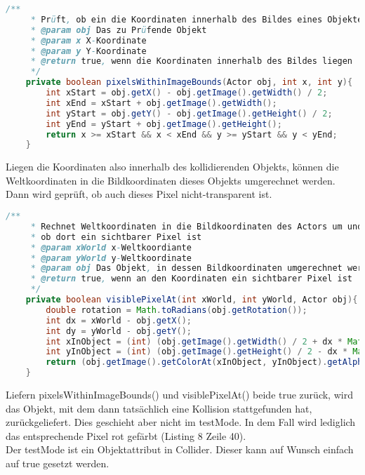 \documentclass{pi1}
\begin{document}
\begin{lstlisting}[caption={\emph{pixelsWithinImageBounds(Actor obj, int x, int y)}-Methode}, firstnumber=97, language=Java]
/**
     * Prüft, ob ein die Koordinaten innerhalb des Bildes eines Objektes liegen
     * @param obj Das zu Prüfende Objekt
     * @param x X-Koordinate
     * @param y Y-Koordinate
     * @return true, wenn die Koordinaten innerhalb des Bildes liegen
     */
    private boolean pixelsWithinImageBounds(Actor obj, int x, int y){
        int xStart = obj.getX() - obj.getImage().getWidth() / 2;
        int xEnd = xStart + obj.getImage().getWidth();
        int yStart = obj.getY() - obj.getImage().getHeight() / 2;
        int yEnd = yStart + obj.getImage().getHeight();
        return x >= xStart && x < xEnd && y >= yStart && y < yEnd;
    }
\end{lstlisting}

Liegen die Koordinaten also innerhalb des kollidierenden Objekts, können die Weltkoordinaten in die Bildkoordinaten dieses Objekts umgerechnet werden. Dann wird geprüft, ob auch dieses Pixel nicht-transparent ist.

\begin{lstlisting}[caption={\emph{visiblePixelAt(int xWorld, int yWorld, Actor obj)}-Methode}, firstnumber=80, language=Java]
/**
     * Rechnet Weltkoordinaten in die Bildkoordinaten des Actors um und prüft
     * ob dort ein sichtbarer Pixel ist
     * @param xWorld x-Weltkoordiante
     * @param yWorld y-Weltkoordinate
     * @param obj Das Objekt, in dessen Bildkoordinaten umgerechnet werden soll
     * @return true, wenn an den Koordinaten ein sichtbarer Pixel ist
     */
    private boolean visiblePixelAt(int xWorld, int yWorld, Actor obj){
        double rotation = Math.toRadians(obj.getRotation());
        int dx = xWorld - obj.getX();
        int dy = yWorld - obj.getY();
        int xInObject = (int) (obj.getImage().getWidth() / 2 + dx * Math.cos(rotation) + dy * Math.sin(rotation));    
        int yInObject = (int) (obj.getImage().getHeight() / 2 - dx * Math.sin(rotation) + dy * Math.cos(rotation));
        return (obj.getImage().getColorAt(xInObject, yInObject).getAlpha() > 0 );
    }
\end{lstlisting}

Liefern pixelsWithinImageBounds() und visiblePixelAt() beide true zurück, wird das Objekt, mit dem dann tatsächlich eine Kollision stattgefunden hat, zurückgeliefert. Dies geschieht aber nicht im testMode. In dem Fall wird lediglich das entsprechende Pixel rot gefärbt (Listing 8 Zeile 40).\\
Der testMode ist ein Objektattribut in Collider. Dieser kann auf Wunsch einfach auf true gesetzt werden.
\end{document}
